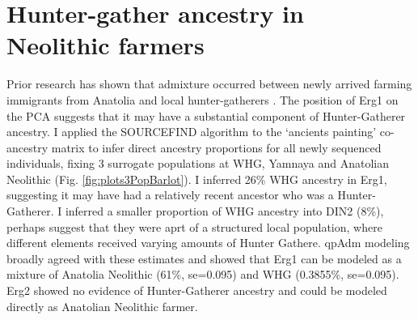 \section{Hunter-gather ancestry in Neolithic farmers}

Prior research has shown that admixture occurred between newly arrived farming immigrants from Anatolia and local hunter-gatherers \cite{Gamba2014, Lipson2017b}. The position of Erg1 on the PCA suggests that it may have a substantial component of Hunter-Gatherer ancestry. I applied the SOURCEFIND algorithm to the `ancients painting' co-ancestry matrix to infer direct ancestry proportions for all newly sequenced individuals, fixing 3 surrogate populations at WHG, Yamnaya and Anatolian Neolithic (Fig. \ref{fig:plots3PopBarlot}). I inferred 26\% WHG ancestry in Erg1, suggesting it may have had a relatively recent ancestor who was a Hunter-Gatherer. I inferred a smaller proportion of WHG ancestry into DIN2 (8\%), perhaps suggest that they were aprt of a structured local population, where different elements received varying amounts of Hunter Gathere. qpAdm modeling broadly agreed with these estimates and showed that Erg1 can be modeled as a mixture of Anatolia Neolithic (61\%, se=0.095) and WHG (0.3855\%, se=0.095).  Erg2 showed no evidence of Hunter-Gatherer ancestry and could be modeled directly as Anatolian Neolithic farmer. 

